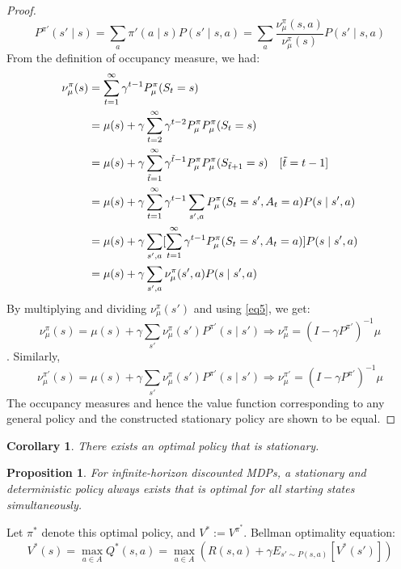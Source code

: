 \documentclass{report}
\newtheorem{proposition}{Proposition}[theorem]
\newtheorem{corollary}{Corollary}[theorem]
\begin{document}
\begin{proof}
    \begin{equation}\label{eq5}
        P^{\pi'}(s'\mid s)=\sum_{a}\pi'(a\mid s)P(s'\mid s,a)=\sum_{a} \frac{\nu_{\mu}^{\pi}(s,a)}{\nu_{\mu}^{\pi}(s)}P(s'\mid s,a)
    \end{equation}
    From the definition of occupancy measure, we had:
    \begin{equation*}
        \begin{split}
            \nu_{\mu}^{\pi}(s)&=\sum_{t=1}^{\infty}\gamma^{t-1}P_{\mu}^{\pi}(S_t=s) \\
            &= \mu(s)+\gamma \sum_{t=2}^{\infty}\gamma^{t-2}P_{\mu}^{\pi}P_{\mu}^{\pi}(S_t=s)\\
            &= \mu(s)+\gamma \sum_{\Tilde{t}=1}^{\infty}\gamma^{\Tilde{t}-1}P_{\mu}^{\pi}P_{\mu}^{\pi}(S_{\Tilde{t}+1}=s)\quad [\Tilde{t}=t-1] \\
            &=\mu(s)+\gamma \sum_{t=1}^{\infty}\gamma^{t-1}\sum_{s',a}P_{\mu}^{\pi}(S_t=s',A_t=a)P(s\mid s',a)\\
            &=\mu(s)+\gamma \sum_{s',a}[\sum_{t=1}^{\infty}\gamma^{t-1}P_{\mu}^{\pi}(S_t=s',A_t=a)]P(s\mid s',a)\\
            &=\mu(s)+\gamma  \sum_{s',a}\nu_{\mu}^{\pi}(s',a)P(s\mid s',a)
        \end{split}
    \end{equation*}
    By multiplying and dividing $\nu_{\mu}^{\pi}(s')$ and using \ref{eq5}, we get:
    \[
    \nu_{\mu}^{\pi}(s)=\mu(s)+\gamma\sum_{s'}\nu_{\mu}^{\pi}(s')P^{\pi'}(s\mid s') \Rightarrow \nu_{\mu}^{\pi}=(I-\gamma P^{\pi'})^{-1}\mu
    \].
    Similarly, 
    \[
    \nu_{\mu}^{\pi'}(s)=\mu(s)+\gamma\sum_{s'}\nu_{\mu}^{\pi}(s')P^{\pi'}(s\mid s') \Rightarrow \nu_{\mu}^{\pi'}=(I-\gamma P^{\pi'})^{-1}\mu
    \]
    The occupancy measures and hence the value function corresponding to any general policy and the constructed stationary policy are shown to be equal.
\end{proof}
\begin{corollary}
    There exists an optimal policy that is stationary.
\end{corollary}
\begin{proposition}
    For infinite-horizon discounted MDPs, a stationary and deterministic policy always exists that is optimal for all starting states simultaneously. 
\end{proposition}
Let $\pi^*$ denote this optimal policy, and $V^* := V^{\pi^*}$. Bellman optimality equation: 
\begin{equation}\label{eq3}
    V^*(s)=\max_{a\in A}Q^*(s,a)=\max_{a\in A}(R(s,a)+\gamma E_{s'\sim P(s,a)}[V^*(s')])
\end{equation}
\end{document}
